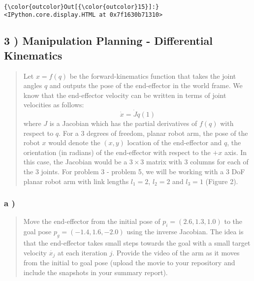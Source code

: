 \documentclass{article}
\begin{document}
    \begin{center}
    \end{center}
    { \hspace*{\fill} \\}
    


            \begin{Verbatim}[commandchars=\\\{\}]
{\color{outcolor}Out[{\color{outcolor}15}]:} <IPython.core.display.HTML at 0x7f1630b71310>
\end{Verbatim}
        

    \subsection{3 ) Manipulation Planning - Differential Kinematics}


    \begin{quote}
Let $x=f(q)$ be the forward-kinematics function that takes the joint
angles $q$ and outputs the pose of the end-effector in the world frame.
We know that the end-effector velocity can be written in terms of joint
velocities as follows:\\\[\dot{x}=\dot{J}q(1)\] where $J$ is a Jacobian
which has the partial derivatives of $f(q)$ with respect to $q$. For a
$3$ degrees of freedom, planar robot arm, the pose of the robot $x$
would denote the $(x,y)$ location of the end-effector and $q$, the
orientation (in radians) of the end-effector with respect to the $+x$
axis. In this case, the Jacobian would be a $3 \times 3$ matrix with $3$
columns for each of the $3$ joints. For problem 3 - problem 5, we will
be working with a $3$ DoF planar robot arm with link lengths $l_1=2$,
$l_2=2$ and $l_3=1$ (Figure 2).
\end{quote}


    \subsubsection{a )}


    \begin{quote}
Move the end-effector from the initial pose of $p_i = ( 2.6, 1.3, 1.0 )$
to the goal pose $p_g = (− 1.4, 1.6, − 2.0 )$ using the inverse
Jacobian. The idea is that the end-effector takes small steps towards
the goal with a small target velocity $\dot{x_j}$ at each iteration $j$.
Provide the video of the arm as it moves from the initial to goal pose
(upload the movie to your repository and include the snapshots in your
summary report).
\end{quote}
\end{document}
